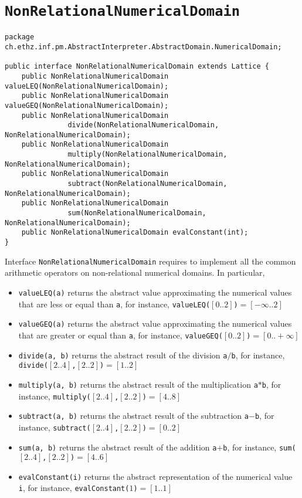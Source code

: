\documentclass[11pt]{article}
\newcommand{\statement}[1]{\lstinline{#1}}
\begin{document}
\section{\statement{NonRelationalNumericalDomain}}

\begin{lstlisting}
package ch.ethz.inf.pm.AbstractInterpreter.AbstractDomain.NumericalDomain;

public interface NonRelationalNumericalDomain extends Lattice {
    public NonRelationalNumericalDomain valueLEQ(NonRelationalNumericalDomain);
    public NonRelationalNumericalDomain valueGEQ(NonRelationalNumericalDomain);
    public NonRelationalNumericalDomain 
               divide(NonRelationalNumericalDomain, NonRelationalNumericalDomain);
    public NonRelationalNumericalDomain 
               multiply(NonRelationalNumericalDomain, NonRelationalNumericalDomain);
    public NonRelationalNumericalDomain 
               subtract(NonRelationalNumericalDomain, NonRelationalNumericalDomain);
    public NonRelationalNumericalDomain 
               sum(NonRelationalNumericalDomain, NonRelationalNumericalDomain);
    public NonRelationalNumericalDomain evalConstant(int);
}
\end{lstlisting}

Interface \statement{NonRelationalNumericalDomain} requires to implement all the common arithmetic operators on non-relational numerical domains. In particular,
\begin{itemize}
\item \statement{valueLEQ(a)} returns the abstract value approximating the numerical values that are less or equal than \statement{a}, for instance, \statement{valueLEQ(}$[0..2]$\statement{)}$=[-\infty..2]$
\item \statement{valueGEQ(a)} returns the abstract value approximating the numerical values that are greater or equal than \statement{a}, for instance, \statement{valueGEQ(}$[0..2]$\statement{)}$=[0..+\infty]$
\item \statement{divide(a, b)} returns the abstract result of the division \statement{a}$/$\statement{b}, for instance, \statement{divide(}$[2..4]$\statement{,}$[2..2]$\statement{)}$=[1..2]$
\item \statement{multiply(a, b)} returns the abstract result of the multiplication \statement{a}$*$\statement{b}, for instance, \statement{multiply(}\allowbreak$[2..4]$\statement{,}$[2..2]$\statement{)}$=[4..8]$
\item \statement{subtract(a, b)} returns the abstract result of the subtraction \statement{a}$-$\statement{b}, for instance, \statement{subtract(}\allowbreak$[2..4]$\statement{,}$[2..2]$\statement{)}$=[0..2]$
\item \statement{sum(a, b)} returns the abstract result of the addition \statement{a}$+$\statement{b}, for instance, \statement{sum(}$[2..4]$\statement{,}$[2..2]$\statement{)}$=[4..6]$
\item \statement{evalConstant(i)} returns the abstract representation of the numerical value \statement{i}, for instance, \statement{evalConstant(}$1$\statement{)}$=[1..1]$
\end{itemize}
\end{document}
